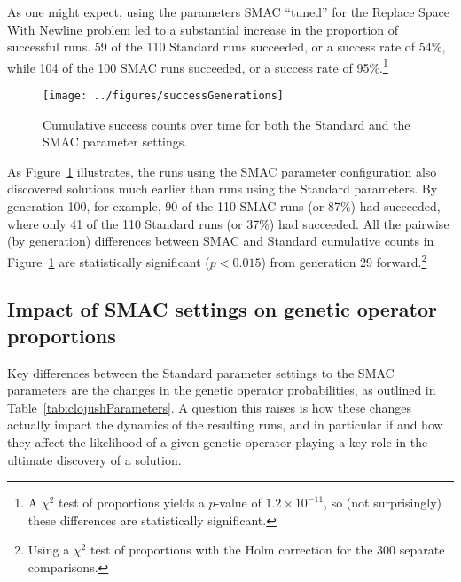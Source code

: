 As one might expect, using the parameters SMAC ``tuned'' for the
Replace Space With Newline problem led to a 
substantial increase in the proportion of successful runs. 59 of 
the 110 Standard runs succeeded, or a success rate of 54\%, while 104 of the
100 SMAC runs succeeded, or a success rate of 95\%.\footnote{A $\chi^2$ test of 
proportions yields a $p$-value of $1.2 \times 10^{-11}$, so (not surprisingly)
these differences are statistically significant.}

\begin{figure}
	\texttt{[image: ../figures/successGenerations]}
	\caption{Cumulative success counts over time for both the Standard
	and the SMAC parameter settings.}
	\label{fig:successGenerations}
\end{figure}

As Figure~\ref{fig:successGenerations} illustrates, the runs using the SMAC
parameter configuration also discovered solutions much earlier than runs using
the Standard parameters. By generation 100, for example, 90 of the 110 SMAC 
runs (or 87\%) had succeeded, where only 41 of the 110 Standard runs 
(or 37\%) had succeeded. All the pairwise (by generation) differences 
between SMAC and Standard cumulative counts in 
Figure~\ref{fig:successGenerations} are 
statistically significant ($p<0.015$)
from generation 29 forward.\footnote{Using a $\chi^2$ test of proportions 
	with the Holm correction for the 300 separate comparisons.}

\subsection{Impact of SMAC settings on genetic operator proportions}
\label{sec:SMACimpactRSWNops}

Key differences between the Standard parameter settings to the SMAC parameters
are the changes in the genetic operator probabilities, as outlined in
Table~\ref{tab:clojushParameters}. 
A question this raises is how these changes
actually impact the dynamics of the resulting runs, and in particular if and
how they affect the likelihood of a given genetic operator playing a key
role in the ultimate discovery of a solution.


